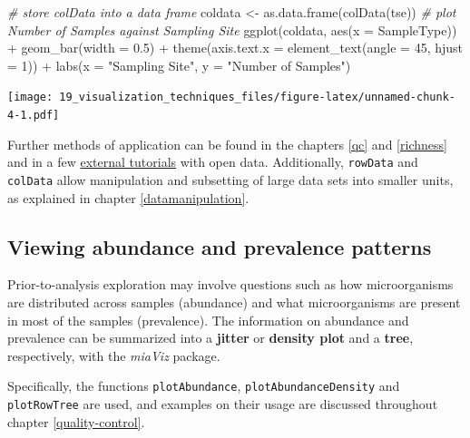 \documentclass[
]{book}
\newenvironment{Shaded}{\begin{snugshade}}{\end{snugshade}}
\newcommand{\AttributeTok}[1]{\textcolor[rgb]{0.77,0.63,0.00}{#1}}
\newcommand{\CommentTok}[1]{\textcolor[rgb]{0.56,0.35,0.01}{\textit{#1}}}
\newcommand{\DecValTok}[1]{\textcolor[rgb]{0.00,0.00,0.81}{#1}}
\newcommand{\FloatTok}[1]{\textcolor[rgb]{0.00,0.00,0.81}{#1}}
\newcommand{\FunctionTok}[1]{\textcolor[rgb]{0.00,0.00,0.00}{#1}}
\newcommand{\NormalTok}[1]{#1}
\newcommand{\OtherTok}[1]{\textcolor[rgb]{0.56,0.35,0.01}{#1}}
\newcommand{\SpecialCharTok}[1]{\textcolor[rgb]{0.00,0.00,0.00}{#1}}
\newcommand{\StringTok}[1]{\textcolor[rgb]{0.31,0.60,0.02}{#1}}
\begin{document}
\begin{Shaded}
\begin{Highlighting}[]
\CommentTok{\# store colData into a data frame}
\NormalTok{coldata }\OtherTok{\textless{}{-}} \FunctionTok{as.data.frame}\NormalTok{(}\FunctionTok{colData}\NormalTok{(tse))}
\CommentTok{\# plot Number of Samples against Sampling Site}
\FunctionTok{ggplot}\NormalTok{(coldata, }\FunctionTok{aes}\NormalTok{(}\AttributeTok{x =}\NormalTok{ SampleType)) }\SpecialCharTok{+}
  \FunctionTok{geom\_bar}\NormalTok{(}\AttributeTok{width =} \FloatTok{0.5}\NormalTok{) }\SpecialCharTok{+}
  \FunctionTok{theme}\NormalTok{(}\AttributeTok{axis.text.x =} \FunctionTok{element\_text}\NormalTok{(}\AttributeTok{angle =} \DecValTok{45}\NormalTok{, }\AttributeTok{hjust =} \DecValTok{1}\NormalTok{)) }\SpecialCharTok{+}
  \FunctionTok{labs}\NormalTok{(}\AttributeTok{x =} \StringTok{"Sampling Site"}\NormalTok{,}
       \AttributeTok{y =} \StringTok{"Number of Samples"}\NormalTok{)}
\end{Highlighting}
\end{Shaded}

\texttt{[image: 19\_visualization\_techniques\_files/figure-latex/unnamed-chunk-4-1.pdf]}

Further methods of application can be found in the chapters \ref{qc}
and \ref{richness} and in a few \href{https://github.com/davismcc/scater_tutorials_open_data}{external
tutorials}
with open data. Additionally, \texttt{rowData} and \texttt{colData} allow
manipulation and subsetting of large data sets into smaller units, as
explained in chapter \ref{datamanipulation}.

\hypertarget{viewing-abundance-and-prevalence-patterns}{%
\subsection{Viewing abundance and prevalence patterns}\label{viewing-abundance-and-prevalence-patterns}}

Prior-to-analysis exploration may involve questions such as how microorganisms
are distributed across samples (abundance) and what microorganisms are present
in most of the samples (prevalence). The information on abundance and prevalence
can be summarized into a \textbf{jitter} or \textbf{density plot} and a \textbf{tree},
respectively, with the \emph{miaViz} package.

Specifically, the functions \texttt{plotAbundance}, \texttt{plotAbundanceDensity}
and \texttt{plotRowTree} are used, and examples on their usage are discussed
throughout chapter \ref{quality-control}.
\end{document}
